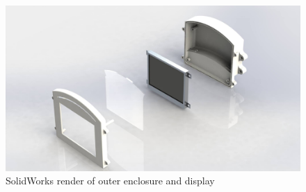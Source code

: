 \begin{figure}[H]
\begin{center}
\includegraphics[width=12cm]{Figures/device_render_expanded.jpg}
\end{center}
\caption{SolidWorks render of outer enclosure and display}
\label{fig:device_render_expanded}
\end{figure}
